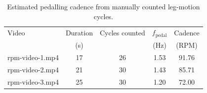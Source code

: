 \begin{table}[htbp]
    \centering
    \caption{Estimated pedalling cadence from manually counted leg-motion cycles.}
    \label{tab:pedalling_frequency}
    \begin{tabular}{lcccc}
        \toprule
        Video
        & Duration
        & Cycles counted
        & $f_{\text{pedal}}$
        & Cadence \\
        & (s)
        &
        & (Hz)
        & (RPM) \\
        \midrule
        rpm-video-1.mp4 & 17 & 26 & 1.53 & 91.76 \\
        rpm-video-2.mp4 & 21 & 30 & 1.43 & 85.71 \\
        rpm-video-3.mp4 & 25 & 30 & 1.20 & 72.00 \\
        \bottomrule
    \end{tabular}
    \label{tab:leg-rpm}
\end{table} 
